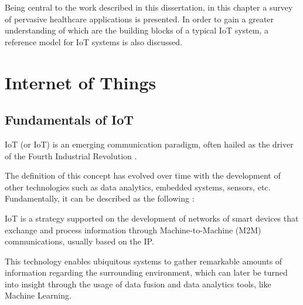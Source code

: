 Being central to the work described in this dissertation, in this chapter a survey of pervasive healthcare applications is presented. In order to gain a greater understanding of which are the building blocks of a typical \acf{IoT} system, a reference model for \acs{IoT} systems is also discussed. 


\section{Internet of Things}

\subsection{Fundamentals of \acs{IoT}}


\acl{IoT} (or \acs{IoT}) is an emerging communication paradigm, often hailed as the driver of the Fourth Industrial Revolution \cite{Aceto2020}. \bigskip

The definition of this concept has evolved over time with the development of other technologies such as data analytics, embedded systems, sensors, etc. Fundamentally, it can be described as the following \cite{Baker2017}: \bigskip

\begin{tcolorbox}[colback=blue!5!white,colframe=blue!75!black]
    \acs{IoT} is a strategy supported on the development of networks of smart devices that exchange and process information through Machine-to-Machine (M2M) communications, usually based on the \acf{IP}.
\end{tcolorbox}

This technology enables ubiquitous systems to gather remarkable amounts of information regarding the surrounding environment, which can later be turned into insight through the usage of data fusion and data analytics tools, like Machine Learning. \bigskip

